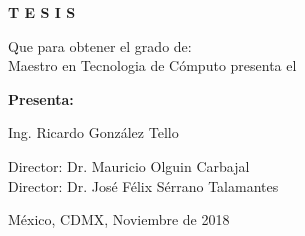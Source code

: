 \vfill
\begin{center}
    \Large\bfseries
   T E S I S
\end{center}

\vfill
\begin{center}
    \large
   Que para obtener el grado de: \\
Maestro en Tecnologia de C\'omputo  presenta el
\end{center}

\vfill
\begin{center}
    \large\bfseries
    Presenta:
    
   Ing. Ricardo Gonz\'alez Tello
\end{center}

\vfill\vfill\vfill
\begin{center}
    \large
    Director: Dr. Mauricio Olguin Carbajal\\
    Director: Dr. Jos\'e F\'elix S\'errano Talamantes
\end{center}

\vfill
\begin{center}
\large
    M\'exico, CDMX, \hfill Noviembre de 2018
\end{center}

\cleardoublepage



